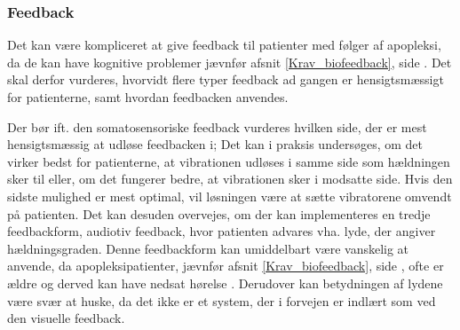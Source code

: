 \subsubsection{Feedback}
Det kan være kompliceret at give feedback til patienter med følger af apopleksi, da de kan have kognitive problemer jævnfør afsnit \ref{Krav_biofeedback}, side \pageref{Krav_biofeedback}. Det skal derfor vurderes, hvorvidt flere typer feedback ad gangen er hensigtsmæssigt for patienterne, samt hvordan feedbacken anvendes. %

Der bør ift. den somatosensoriske feedback vurderes hvilken side, der er mest hensigtsmæssig at udløse feedbacken i; Det kan i praksis undersøges, om det virker bedst for patienterne, at vibrationen udløses i samme side som hældningen sker til eller, om det fungerer bedre, at vibrationen sker i modsatte side. Hvis den sidste mulighed er mest optimal, vil løsningen være at sætte vibratorene omvendt på patienten. Det kan desuden overvejes, om der kan implementeres en tredje feedbackform, audiotiv feedback, hvor patienten advares vha. lyde, der angiver hældningsgraden. Denne feedbackform kan umiddelbart være vanskelig at anvende, da apopleksipatienter, jævnfør afsnit \ref{Krav_biofeedback}, side \pageref{Krav_biofeedback}, ofte er ældre og derved kan have nedsat hørelse \cite{Sundhedsstyrelsen2011}. Derudover kan betydningen af lydene være svær at huske, da det ikke er et system, der i forvejen er indlært som ved den visuelle feedback.

